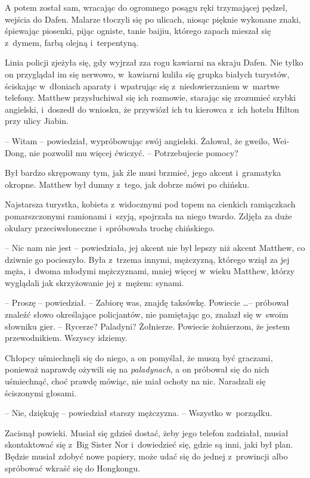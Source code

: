 \documentclass[oneside,polish,11pt,rmheadings]{mwbk}
\begin{document}
A potem został sam, wracając do ogromnego posągu ręki trzymającej pędzel, wejścia do Dafen. Malarze tłoczyli się po ulicach, niosąc pięknie wykonane znaki, śpiewając piosenki, pijąc ogniste, tanie baijiu, którego zapach mieszał się z~dymem, farbą olejną i~terpentyną.

Linia policji zjeżyła się, gdy wyjrzał zza rogu kawiarni na skraju Dafen. Nie tylko on przyglądał im się nerwowo, w~kawiarni kuliła się grupka białych turystów, ściskając w~dłoniach aparaty i~wpatrując się z~niedowierzaniem w~martwe telefony. Matthew przysłuchiwał się ich rozmowie, starając się zrozumieć szybki angielski, i~doszedł do wniosku, że przywiózł ich tu kierowca z~ich hotelu Hilton przy ulicy Jiabin.

-- Witam -- powiedział, wypróbowując swój angielski. Żałował, że gweilo, Wei-Dong, nie pozwolił mu więcej ćwiczyć. -- Potrzebujecie pomocy? 

Był bardzo skrępowany tym, jak źle musi brzmieć, jego akcent i~gramatyka okropne. Matthew był dumny z~tego, jak dobrze mówi po chińsku.

Najstarsza turystka, kobieta z~widocznymi pod topem na cienkich ramiączkach pomarszczonymi ramionami i~szyją, spojrzała na niego twardo. Zdjęła za duże okulary przeciwsłoneczne i~spróbowała trochę chińskiego. 

-- Nic nam nie jest -- powiedziała, jej akcent nie był lepszy niż akcent Matthew, co dziwnie go pocieszyło. Była z~trzema innymi, mężczyzną, którego wziął za jej męża, i~dwoma młodymi mężczyznami, mniej więcej w~wieku Matthew, którzy wyglądali jak skrzyżowanie jej z~mężem: synami.

-- Proszę -- powiedział. -- Zabiorę was, znajdę taksówkę. Powiecie  \ldots  -- próbował znaleźć słowo określające policjantów, nie pamiętając go, znalazł się w~swoim słowniku gier. -- Rycerze? Paladyni? Żołnierze. Powiecie żołnierzom, że jestem przewodnikiem. Wszyscy idziemy. 

Chłopcy uśmiechnęli się do niego, a on pomyślał, że muszą być graczami, ponieważ naprawdę ożywili się na \textit{paladynach}, a on próbował się do nich uśmiechnąć, choć prawdę mówiąc, nie miał ochoty na nic. Naradzali się ściszonymi głosami.

-- Nie, dziękuję -- powiedział starszy mężczyzna. -- Wszystko w~porządku.

Zacisnął powieki. Musiał się gdzieś dostać, żeby jego telefon zadziałał, musiał skontaktować się z~Big Sister Nor i~dowiedzieć się, gdzie są inni, jaki był plan. Będzie musiał zdobyć nowe papiery, może udać się do jednej z~prowincji albo spróbować wkraść się do Hongkongu. 
\end{document}
